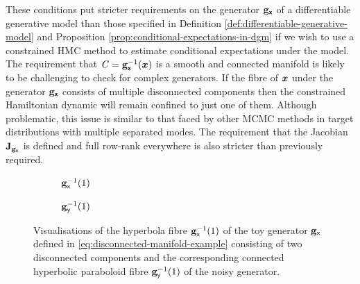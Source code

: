 These conditions put stricter requirements on the generator ${\mathbf{g}}_{\boldsymbol{\mathsf{x}}}$ of a differentiable generative model than those specified in Definition \ref{def:differentiable-generative-model} and Proposition \ref{prop:conditional-expectations-in-dgm} if we wish to use a constrained \ac{HMC} method to estimate conditional expectations under the model. The requirement that $\mathit{C} = {\mathbf{g}}_{\boldsymbol{\mathsf{x}}}^{-1}(\boldsymbol{x})$ is a smooth and connected manifold is likely to be challenging to check for complex generators. If the fibre of $\boldsymbol{x}$ under the generator ${\mathbf{g}}_{\boldsymbol{\mathsf{x}}}$ consists of multiple disconnected components then the constrained Hamiltonian dynamic will remain confined to just one of them. Although problematic, this issue is similar to that faced by other \ac{MCMC} methods in target distributions with multiple separated modes. The requirement that the Jacobian $\mathbf{J}_{{\mathbf{g}}_{\boldsymbol{\mathsf{x}}}}$ is defined and full row-rank everywhere is also stricter than previously required.

\begin{figure}[t]
\begin{subfigure}[b]{0.48\linewidth}
\centering
  \caption{${\mathbf{g}}_{\mathsf{x}}^{-1}(1)$}
  \label{sfig:disconnected-manifold-example-orig}
\end{subfigure}
\begin{subfigure}[b]{0.48\linewidth}
\centering
  \caption{${\mathbf{g}}_{\mathsf{y}}^{-1}(1)$}
  \label{sfig:disconnected-manifold-example-noisy}
\end{subfigure}
\caption[Disconnected manifold example.]{Visualisations of the hyperbola fibre ${\mathbf{g}}_{\mathsf{x}}^{-1}(1)$ of the toy generator ${\mathbf{g}}_{\mathsf{x}}$ defined in \eqref{eq:disconnected-manifold-example} consisting of two disconnected components and the corresponding connected hyperbolic paraboloid fibre ${\mathbf{g}}_{\mathsf{y}}^{-1}(1)$ of the noisy generator.}
\label{fig:disconnected-manifold-example}
\end{figure}

